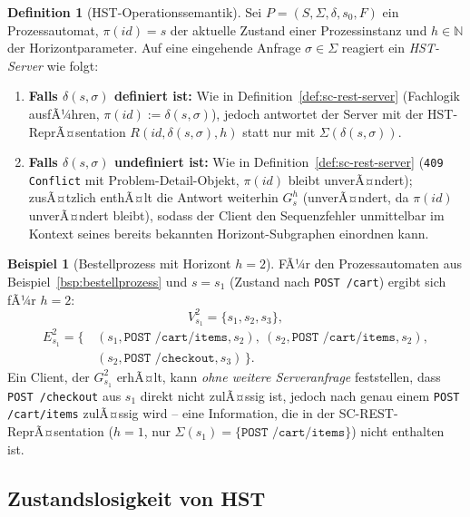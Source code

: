 ﻿\documentclass[a4paper,12pt]{article}
\theoremstyle{definition}
\newtheorem{definition}{Definition}
\newtheorem{beispiel}{Beispiel}
\begin{document}
\begin{definition}[HST-Operationssemantik]
	\label{def:hst-server}
	Sei $P=(S,\Sigma,\delta,s_0,F)$ ein Prozessautomat, $\pi(id)=s$ der aktuelle Zustand
	einer Prozessinstanz und $h\in\mathbb{N}$ der Horizontparameter. Auf eine eingehende
	Anfrage $\sigma\in\Sigma$ reagiert ein \emph{HST-Server} wie folgt:
	\begin{enumerate}
		\item \textbf{Falls $\delta(s,\sigma)$ definiert ist:} Wie in
		Definition~\ref{def:sc-rest-server} (Fachlogik ausfÃ¼hren, $\pi(id):=
		\delta(s,\sigma)$), jedoch antwortet der Server mit der HST-ReprÃ¤sentation
		$R(id,\delta(s,\sigma),h)$ statt nur mit $\Sigma(\delta(s,\sigma))$.
		\item \textbf{Falls $\delta(s,\sigma)$ undefiniert ist:} Wie in
		Definition~\ref{def:sc-rest-server} (\texttt{409 Conflict} mit
		Problem-Detail-Objekt, $\pi(id)$ bleibt unverÃ¤ndert); zusÃ¤tzlich enthÃ¤lt die
		Antwort weiterhin $G_s^h$ (unverÃ¤ndert, da $\pi(id)$ unverÃ¤ndert bleibt), sodass
		der Client den Sequenzfehler unmittelbar im Kontext seines bereits bekannten
		Horizont-Subgraphen einordnen kann.
	\end{enumerate}
\end{definition}

\begin{beispiel}[Bestellprozess mit Horizont $h=2$]
	\label{bsp:hst-bestellprozess}
	FÃ¼r den Prozessautomaten aus Beispiel~\ref{bsp:bestellprozess} und $s=s_1$ (Zustand
	nach \texttt{POST /cart}) ergibt sich fÃ¼r $h=2$:
	\[
		V_{s_1}^2 = \{s_1,s_2,s_3\},
	\]
	\[
		\begin{aligned}
			E_{s_1}^2 = \bigl\{\, &(s_1,\texttt{POST /cart/items},s_2),\
				(s_2,\texttt{POST /cart/items},s_2),\\
				&(s_2,\texttt{POST /checkout},s_3) \,\bigr\}.
		\end{aligned}
	\]
	Ein Client, der $G_{s_1}^2$ erhÃ¤lt, kann \emph{ohne weitere Serveranfrage}
	feststellen, dass \texttt{POST /checkout} aus $s_1$ direkt nicht zulÃ¤ssig ist, jedoch
	nach genau einem \texttt{POST /cart/items} zulÃ¤ssig wird -- eine Information, die in
	der SC-REST-ReprÃ¤sentation ($h=1$, nur $\Sigma(s_1)=\{\texttt{POST /cart/items}\}$)
	nicht enthalten ist.
\end{beispiel}

\subsection{Zustandslosigkeit von HST}
\label{sec:hst-zustandslosigkeit}
\end{document}
